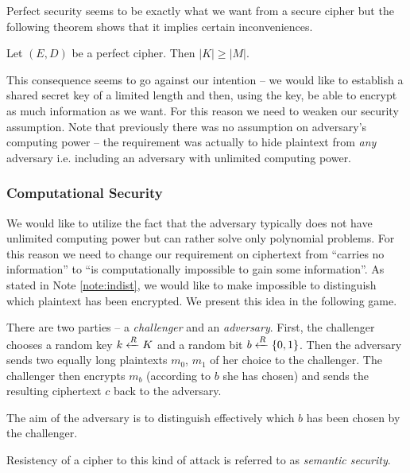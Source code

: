 Perfect security seems to be exactly what we want from a secure cipher but the following theorem shows that it implies certain inconveniences.

\begin{thm}
	Let $(E,D)$ be a perfect cipher. Then $|K| \geq |M|$.
\end{thm}

This consequence seems to go against our intention -- we would like to establish a shared secret key of a limited length and then, using the key, be able to encrypt as much information as we want. For this reason we need to weaken our security assumption. Note that previously there was no assumption on adversary's computing power -- the requirement was actually to hide plaintext from {\em any} adversary i.e. including an adversary with unlimited computing power.

\subsubsection{Computational Security}

We would like to utilize the fact that the adversary typically does not have unlimited computing power but can rather solve only polynomial problems. For this reason we need to change our requirement on ciphertext from ``carries no information'' to ``is computationally impossible to gain some information''. As stated in Note \ref{note:indist}, we would like to make impossible to distinguish which plaintext has been encrypted. We present this idea in the following game.

\begin{game}
\label{game:semsec}
	There are two parties -- a {\em challenger} and an {\em adversary}. First, the challenger chooses a random key $k\xleftarrow{R} K$ and a random bit $b\xleftarrow{R}\{0,1\}$. Then the adversary sends two equally long plaintexts $m_0$, $m_1$ of her choice to the challenger. The challenger then encrypts $m_b$ (according to $b$ she has chosen) and sends the resulting ciphertext $c$ back to the adversary.
	
	The aim of the adversary is to distinguish effectively which $b$ has been chosen by the challenger.
\end{game}

\begin{note}
\label{note:semsec}
	Resistency of a cipher to this kind of attack is referred to as {\em semantic security}.
\end{note}

